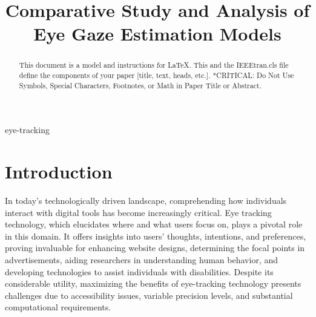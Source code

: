 \documentclass[conference]{IEEEtran}
\begin{document}
\title{Comparative Study and Analysis of Eye Gaze Estimation Models}

\author{
\and
{}
\and
{}
\and
{}
}

\maketitle

\begin{abstract}
This document is a model and instructions for \LaTeX.
This and the IEEEtran.cls file define the components of your paper [title, text, heads, etc.]. *CRITICAL: Do Not Use Symbols, Special Characters, Footnotes, 
or Math in Paper Title or Abstract.
\end{abstract}

\begin{IEEEkeywords}
eye-tracking
\end{IEEEkeywords}

\section{Introduction}

In today's technologically driven landscape, comprehending how individuals interact with digital tools has become increasingly critical. Eye tracking technology, which elucidates where and what users focus on, plays a pivotal role in this domain. It offers insights into users' thoughts, intentions, and preferences, proving invaluable for enhancing website designs, determining the focal points in advertisements, aiding researchers in understanding human behavior, and developing technologies to assist individuals with disabilities. Despite its considerable utility, maximizing the benefits of eye-tracking technology presents challenges due to accessibility issues, variable precision levels, and substantial computational requirements.
\end{document}
